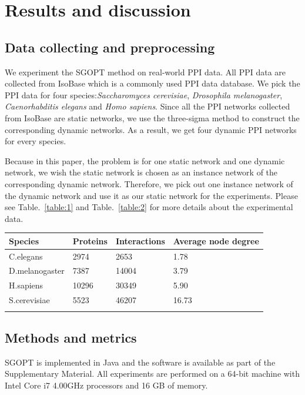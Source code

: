 \documentclass{bioinfo}
\theoremstyle{definition}
\begin{document}
\section{Results and discussion}
\subsection{Data collecting and preprocessing}
We experiment the SGOPT method on real-world PPI data. All PPI data are collected from IsoBase \citep{park2011isobase} which is a commonly used PPI data database. We pick the PPI data for four species:\textit{Saccharomyces cerevisiae}, \textit{Drosophila melanogaster}, \textit{Caenorhabditis elegans} and \textit{Homo sapiens}. Since all the PPI networks collected from IsoBase are static networks, we use the three-sigma method\citep{zhang2016construction} to construct the corresponding dynamic networks. As a result, we get four dynamic PPI networks for every species.

Because in this paper, the problem is for one static network and one dynamic network, we wish the static network is chosen as an instance network of the corresponding dynamic network. Therefore, we pick out one instance network of the dynamic network and use it as our static network for the experiments. Please see Table.~\ref{table:1} and Table.~\ref{table:2} for more details about the experimental data.

\begin{table}[!h]
{
\begin{tabular}{@{}llll@{}}
\toprule 
Species & Proteins & Interactions & Average node degree\\
\midrule
C.elegans & 2974 & 2653 & 1.78\\
D.melanogaster & 7387 & 14004 & 3.79\\
H.sapiens & 10296 & 30349 & 5.90\\
S.cerevisiae & 5523 & 46207 & 16.73\\
\botrule
\end{tabular}
}{}
\end{table}


\subsection{Methods and metrics}
SGOPT is implemented in Java and the software is available as part of the Supplementary Material. All experiments are performed on a 64-bit machine with Intel Core i7 4.00GHz processors and 16 GB of memory. 
\end{document}
